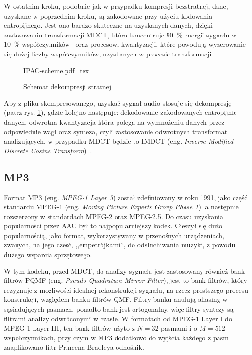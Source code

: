 \documentclass[pl,12pt]{aghdpl}
\let\Oldsubsection\subsection%
\renewcommand{\subsection}{\FloatBarrier\Oldsubsection}
\begin{document}
W ostatnim kroku, podobnie jak w przypadku kompresji bezstratnej, dane, uzyskane
w poprzednim kroku, są zakodowane przy użyciu kodowania entropijnego. Jest ono
bardzo skuteczne na uzyskanych danych, dzięki zastosowaniu transformacji MDCT,
która koncentruje \SI{90}{\percent} energii sygnału w \SI{10}{\percent}
współczynników~\cite{WangYaroslavskyVilermoVaananen2000} oraz procesowi
kwantyzacji, które powodują wyzerowanie się dużej liczby współczynników,
uzyskanych w procesie transformacji.

\begin{figure}[!tbh]
  \centering
  {IPAC-scheme.pdf_tex}
  \caption{Schemat dekompresji stratnej}
  \label{fig:IPAC_scheme}
\end{figure}

Aby z pliku skompresowanego, uzyskać sygnał audio stosuje się dekompresję (patrz
rys. \ref{fig:IPAC_scheme}), gdzie kolejno następuje: dekodowanie zakodowanych
entropijnie danych, odwrotna kwantyzacja która polega na wymnożeniu danych
przez odpowiednie wagi oraz synteza, czyli zastosowanie odwrotnych
transformat analizujących, w przypadku MDCT będzie to IMDCT (eng.
\textit{Inverse Modified Discrete Cosine Transform})~\cite{Brandenburg1999}.

\subsection{MP3}
Format MP3 (eng. \textit{MPEG-1 Layer 3}) został zdefiniowany w roku 1991, jako część
standardu MPEG-1 (eng. \textit{Moving Picture Experts Group Phase 1}), a
następnie rozszerzony w standardach MPEG-2 oraz MPEG-2.5. Do czasu uzyskania
popularności przez AAC był to najpopularniejszy kodek. Cieszył się
dużo popularnością, jako format, wykorzystywany w przenośnych urządzeniach,
zwanych, na jego cześć, ,,empetrójkami'', do odsłuchiwania muzyki, z powodu dużego
wsparcia sprzętowego.

W tym kodeku, przed MDCT, do analizy sygnału jest zastosowany również bank
filtrów PQMF (eng. \textit{Pseudo Quadrature Mirror Filter}), jest to bank
filtrów, który rezygnuje z możliwości idealnej rekonstrukcji sygnału, na rzecz
prostszego procesu konstrukcji, względem banku filtrów QMF. Filtry banku
anulują aliasing w sąsiadujących pasmach, ponadto bank jest ortogonalny, więc
filtry syntezy są filtrami analizy odwróconymi w czasie.  W formatach od MPEG-1
Layer I do MPEG-1 Layer III, ten bank filtrów użyto z $N = 32$ pasmami i o $M =
512$ współczynnikach, przy czym w MP3 dodatkowo do wyjścia każdego z pasm
zaaplikowano filtr Princena-Bradleya {\color{red}odnośnik}.
\end{document}

